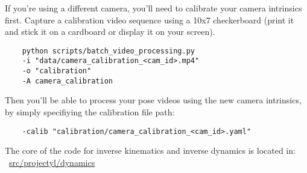 If you're using a different camera, you'll need to calibrate your camera intrinsics first.
Capture a calibration video sequence using a 10x7 checkerboard (print it and stick it on a cardboard or display it on your screen).

\begin{verbatim}
    python scripts/batch_video_processing.py
    -i "data/camera_calibration_<cam_id>.mp4"
    -o "calibration"
    -A camera_calibration
\end{verbatim}

Then you'll be able to process your pose videos using the new camera intrinsics, by simply specifiying
the calibration file path:
\begin{verbatim}
    -calib "calibration/camera_calibration_<cam_id>.yaml"
\end{verbatim}

The core of the code for inverse kinematics and inverse dynamics is located in:
~\href{https://github.com/balthazarneveu/monocular_pose_and_forces_estimation/tree/main/src/projectyl/dynamics}{src/projectyl/dynamics}